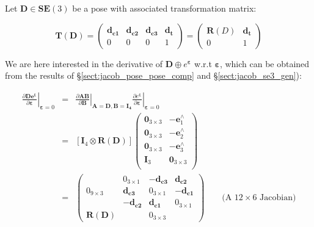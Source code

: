 \documentclass[a4paper,11pt]{report}
\newcommand{\E}{{\bm{\varepsilon}}}
\newcommand{\hatop}[1]{#1^\wedge}
\begin{document}
Let $\mathbf{D} \in \mathbf{SE}(3)$ be a pose with associated transformation matrix:

\begin{equation}
\mathbf{T}(\mathbf{D}) =
\left(
\begin{array}{ccc|c}
 \mathbf{d_{c1}}  & \mathbf{d_{c2}}  & \mathbf{d_{c3}}  & \mathbf{d_{t}}  \\
\hline
  0 & 0 & 0 & 1
\end{array}
\right)
=
\left(
\begin{array}{c|c}
 \mathbf{R}(D) & \mathbf{d_{t}} \\
\hline
     0 & 1
\end{array}
\right)
\end{equation}


We are here interested in the derivative of $\mathbf{D} \oplus e^\E$ w.r.t $\E$,
which can be obtained from the results of \S\ref{sect:jacob_pose_pose_comp} and \S\ref{sect:jacob_se3_gen}):

\begin{eqnarray}
\left. \frac{\partial \mathbf{D e^\E}}{\partial \E} \right|_{\E = 0}
&=&
\left. \frac{\partial \mathbf{A} \mathbf{B}}{\partial \mathbf{B} } \right|_{\mathbf{A}=\mathbf{D}, \mathbf{B}=\mathbf{I_4}}
\left. \frac{\partial e^\E}{\partial \E} \right|_{\E=0}
\\
&=&
\left[ \mathbf{I}_4 \otimes \mathbf{R}(\mathbf{D}) \right]
\left(
\begin{array}{cc}
 \mathbf{0}_{3\times 3}  & -\hatop{\mathbf{e}}_1 \\
 \mathbf{0}_{3\times 3}  & -\hatop{\mathbf{e}}_2 \\
 \mathbf{0}_{3\times 3}  & -\hatop{\mathbf{e}}_3 \\
 \mathbf{I}_{3}  & \mathbf{0}_{3\times 3} \\
\end{array}
\right)
\\
\label{eq:jacob.d_eps_wrt_eps}
&=&
\left(
\begin{array}{c|ccc}
  ~  &  0_{3\times 1}  & -\mathbf{d_{c3}} & \mathbf{d_{c2}} \\
  0_{9\times 3}
     & \mathbf{d_{c3}} & 0_{3\times 1} & -\mathbf{d_{c1}} \\
  ~  &  -\mathbf{d_{c2}} & \mathbf{d_{c1}} & 0_{3\times 1} \\
\hline
  \mathbf{R}(\mathbf{D})   & ~ & 0_{3 \times 3} &
\end{array}
\right)
\quad\quad \text{(A $12 \times 6$ Jacobian)}
\end{eqnarray}
\end{document}
